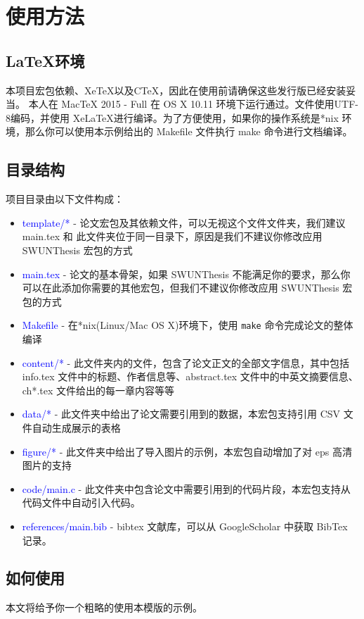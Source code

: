 ﻿\chapter{使用方法}
\section{\LaTeX 环境}
本项目宏包依赖\LaTeXe 、Xe\TeX 以及C\TeX ，因此在使用前请确保这些发行版已经安装妥当。
本人在 MacTeX 2015 - Full 在 OS X 10.11 环境下运行通过。文件使用UTF-8编码，并使用 Xe\LaTeX 进行编译。为了方便使用，如果你的操作系统是*nix 环境，那么你可以使用本示例给出的 Makefile 文件执行 make 命令进行文档编译。

\section{目录结构}
项目目录由以下文件构成：
\begin{itemize}
\item \textcolor{blue}{template/*} - 论文宏包及其依赖文件，可以无视这个文件文件夹，我们建议 main.tex 和 此文件夹位于同一目录下，原因是我们不建议你修改应用 SWUNThesis 宏包的方式
\item \textcolor{blue}{main.tex} - 论文的基本骨架，如果 SWUNThesis 不能满足你的要求，那么你可以在此添加你需要的其他宏包，但我们不建议你修改应用 SWUNThesis 宏包的方式
\item \textcolor{blue}{Makefile} - 在*nix(Linux/Mac OS X)环境下，使用 \verb|make| 命令完成论文的整体编译

\item \textcolor{blue}{content/*} - 此文件夹内的文件，包含了论文正文的全部文字信息，其中包括 info.tex 文件中的标题、作者信息等、abstract.tex 文件中的中英文摘要信息、ch*.tex 文件给出的每一章内容等等
\item \textcolor{blue}{data/*} - 此文件夹中给出了论文需要引用到的数据，本宏包支持引用 CSV 文件自动生成展示的表格
\item \textcolor{blue}{figure/*} -  此文件夹中给出了导入图片的示例，本宏包自动增加了对 eps 高清图片的支持
\item \textcolor{blue}{code/main.c} - 此文件夹中包含论文中需要引用到的代码片段，本宏包支持从代码文件中自动引入代码。
\item \textcolor{blue}{references/main.bib} - bibtex 文献库，可以从 GoogleScholar 中获取 BibTex 记录。
\end{itemize}

\section{如何使用}
本文将给予你一个粗略的使用本模版的示例。
